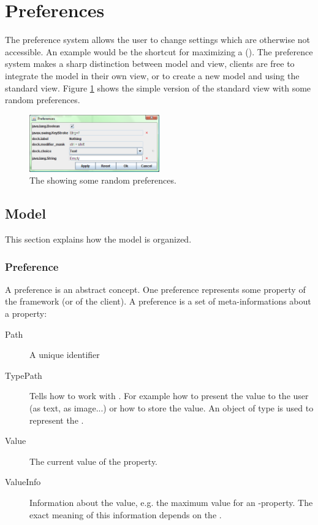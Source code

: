 \section{Preferences}
The preference system allows the user to change settings which are otherwise not accessible. An example would be the shortcut for maximizing a  (). The preference system makes a sharp distinction between model and view, clients are free to integrate the model in their own view, or to create a new model and using the standard view. Figure \ref{fig:preferences} shows the simple version of the standard view with some random preferences.

\begin{figure}[ht]
\centering
\includegraphics[width=0.5\textwidth]{preferences/preferences}
\caption{The  showing some random preferences.}
\label{fig:preferences}
\end{figure}

\subsection{Model}
This section explains how the model is organized.

\subsubsection{Preference}
A preference is an abstract concept. One preference represents some property of the framework (or of the client). A preference is a set of meta-informations about a property:
\begin{description}
 \item[Path] A unique identifier
 \item[TypePath] Tells how to work with . For example how to present the value to the user (as text, as image...) or how to store the value. An object of type  is used to represent the .
 \item[Value] The current value of the property.
 \item[ValueInfo] Information about the value, e.g. the maximum value for an \linebreak {}-property. The exact meaning of this information depends on the .
\end{description}

